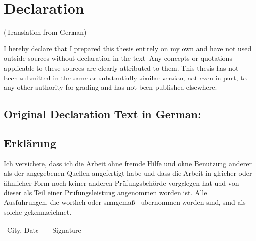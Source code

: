 \ifthenelse{
	\equal{\ausarbeitungsTyp}{\ausarbeitungsTypMaster}
	\OR
	\equal{\ausarbeitungsTyp}{\ausarbeitungsTypDiplom}
	\OR
	\equal{\ausarbeitungsTyp}{\ausarbeitungsTypBachelor}
	}
{
	

	\chapter*{Declaration}\vspace{-24pt}
	
	(Translation from German)\newline
	
	\noindent I hereby declare that I prepared this thesis entirely on my own and have not used outside sources
	without declaration in the text. Any concepts or quotations applicable to these sources are
	clearly attributed to them. This thesis has not been submitted in the same or substantially similar
	version, not even in part, to any other authority for grading and has not been published elsewhere.

	\section*{Original Declaration Text in German:}

	\section*{Erkl\"arung}
	
	Ich versichere, dass ich die Arbeit ohne fremde Hilfe und ohne Benutzung anderer als der
	angegebenen Quellen angefertigt habe und dass die Arbeit in gleicher oder \"ahnlicher Form
	noch keiner anderen Pr\"ufungsbeh\"orde vorgelegen hat und von dieser als Teil einer
	Pr\"ufungsleistung angenommen worden ist. Alle Ausf\"uhrungen, die w\"ortlich oder sinngem\"a\ss~
	\"ubernommen worden sind, sind als solche ge\-kenn\-zeich\-net.\\[27pt]
	
	
	\begin{center}
		\begin{tabular}{l p{} r}
		  \cline{1-1} \cline{3-3}
		  \begin{minipage}[t]{0.4\textwidth}
		    \centering
		    City, Date
			\end{minipage}
			&
			\begin{minipage}[t]{0.2\textwidth}
			\end{minipage}
			&
			\begin{minipage}[t]{0.4\textwidth}
			  \centering
			  Signature
			\end{minipage}
		\end{tabular}
	\end{center}
}
{
}


\tableofcontents



